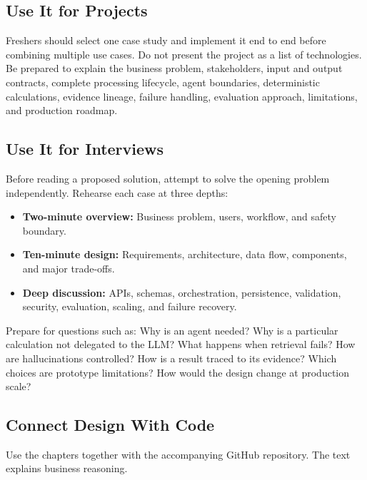 \subsection*{Use It for Projects}

Freshers should select one case study and implement it end to end before combining multiple use cases. Do not present the project as a list of technologies. Be prepared to explain the business problem, stakeholders, input and output contracts, complete processing lifecycle, agent boundaries, deterministic calculations, evidence lineage, failure handling, evaluation approach, limitations, and production roadmap.

\subsection*{Use It for Interviews}

Before reading a proposed solution, attempt to solve the opening problem independently. Rehearse each case at three depths:

\begin{itemize}
  \item \textbf{Two-minute overview:} Business problem, users, workflow, and safety boundary.
  \item \textbf{Ten-minute design:} Requirements, architecture, data flow, components, and major trade-offs.
  \item \textbf{Deep discussion:} APIs, schemas, orchestration, persistence, validation, security, evaluation, scaling, and failure recovery.
\end{itemize}

Prepare for questions such as: Why is an agent needed? Why is a particular calculation not delegated to the LLM? What happens when retrieval fails? How are hallucinations controlled? How is a result traced to its evidence? Which choices are prototype limitations? How would the design change at production scale?

\subsection*{Connect Design With Code}

Use the chapters together with the accompanying GitHub repository. The text explains business reasoning.